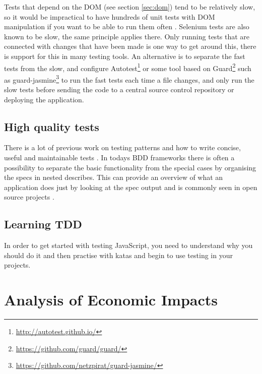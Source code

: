 \documentclass[11pt]{article}
\begin{document}
Tests that depend on the DOM (see section \ref{sec:dom}) tend to be relatively slow, so it would be impractical to have hundreds of unit tests with DOM manipulation if you want to be able to run them often \cite[questions~21-22]{Stenmark}. Selenium tests are also known to be slow, the same principle applies there. Only running tests that are connected with changes that have been made is one way to get around this, there is support for this in many testing tools. An alternative is to separate the fast tests from the slow, and configure Autotest\footnote{\url{http://autotest.github.io/}} or some tool based on Guard\footnote{\url{https://github.com/guard/guard/}} such as guard-jasmine\footnote{\url{https://github.com/netzpirat/guard-jasmine/}} to run the fast tests each time a file changes, and only run the slow tests before sending the code to a central source control repository or deploying the application.

\subsection{High quality tests}
\label{HighQuality}

There is a lot of previous work on testing patterns and how to write concise, useful and maintainable tests \cite[part~III]{TestPatterns}\cite[ch.~3-5]{BDDJS}\cite[p.~461-474]{Tddjs}\cite[p.~86-87]{TestableJS}\cite[p.~13-14]{JasmineBook}. In todays BDD frameworks there is often a possibility to separate the basic functionality from the special cases by organising the specs in nested describes. This can provide an overview of what an application does just by looking at the spec output and is commonly seen in open source projects \cite[question~42]{Stenmark}.

\subsection{Learning TDD}

In order to get started with testing JavaScript, you need to understand why you should do it \cite[question~38]{Edelstam} and then practise with katas and begin to use testing in your projects.

\section{Analysis of Economic Impacts}
\end{document}
